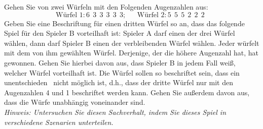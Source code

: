 \begin{Exercise}
	Gehen Sie von zwei Würfeln mit den Folgenden Augenzahlen aus:
	\begin{equation*}
		\text{Würfel 1}:6~~3~~3~~3~~3~~3;~~~~~~~\text{Würfel 2}:5~~5~~5~~2~~2~~2~~
	\end{equation*}
	Geben Sie eine Beschriftung für einen dritten Würfel so an, dass das folgende Spiel für den Spieler B vorteilhaft ist: Spieler A darf einen der drei Würfel wählen, dann darf Spieler B einen der verbleibenden Würfel wählen. Jeder würfelt mit dem von ihm gewählten Würfel. Derjenige, der die höhere Augenzahl hat, hat gewonnen. Gehen Sie hierbei davon aus, dass Spieler B in jedem Fall weiß, welcher Würfel vorteilhaft ist. Die Würfel sollen so beschriftet sein, dass ein \glqq unentschieden\grqq~ nicht möglich ist, d.h., dass der dritte Würfel nur mit den Augenzahlen 4 und 1 beschriftet werden kann. Gehen Sie außerdem davon aus, dass die Würfe unabhängig voneinander sind.\\
	\textit{Hinweis: Untersuchen Sie diesen Sachverhalt, indem Sie dieses Spiel in verschiedene Szenarien unterteilen.}\\
	
\end{Exercise}

